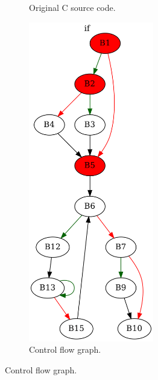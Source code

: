 \begin{figure}[htbp]
	\centering
	\begin{subfigure}[b]{0.30\textwidth}
		\centering
		
		\caption{Original C source code.}
	\end{subfigure}
	\begin{subfigure}[b]{0.50\textwidth}
		\centering
		\includegraphics[width=0.6\textwidth]{inc/appendices/examples/interval/example/sample/f_0005a.png}
		\caption{Control flow graph.}
	\end{subfigure}
\end{figure}

